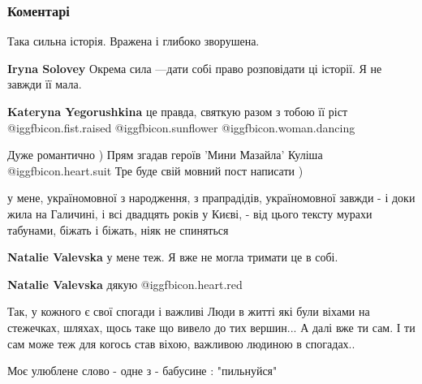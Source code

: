  
 
 
 
 
\subsubsection{Коментарі}

\begin{itemize} %
Така сильна історія. Вражена і глибоко зворушена.

\begin{itemize} %
\textbf{Iryna Solovey} Окрема сила —дати собі право розповідати ці історії. Я не завжди її мала.

\textbf{Kateryna Yegorushkina} це правда, святкую разом з тобою її ріст 
@igg{fbicon.fist.raised}  @igg{fbicon.sunflower}  @igg{fbicon.woman.dancing} 
\end{itemize} %


Дуже романтично ) Прям згадав героїв 'Мини Мазайла' Куліша @igg{fbicon.heart.suit} Тре буде свій мовний пост написати )


у мене, україномовної з народження, з прапрадідів, україномовної завжди - і
доки жила на Галичині, і всі двадцять років у Києві, - від цього тексту мурахи
табунами, біжать і біжать, ніяк не спиняться

\begin{itemize} %
\textbf{Natalie Valevska} у мене теж. Я вже не могла тримати це в собі.

\textbf{Natalie Valevska} дякую @igg{fbicon.heart.red}
\end{itemize} %


Так, у кожного є свої спогади і важливі Люди в житті які були віхами на
стежечках, шляхах, щось таке що вивело до тих вершин... А далі вже ти сам. І ти
сам може теж для когось став віхою, важливою людиною в спогадах..

Моє улюблене слово - одне з - бабусине : "пильнуйся"


\end{itemize}
